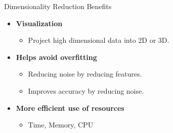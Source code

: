 \documentclass[serif, aspectratio=169]{beamer}
\begin{document}
\begin{frame}{Dimensionality Reduction Benefits}
    \begin{itemize}
        \item \textbf{Visualization}
            \begin{itemize}
                \item Project high dimensional data into 2D or 3D.
            \end{itemize}
        \item \textbf{Helps avoid overfitting}
            \begin{itemize}
                \item Reducing noise by reducing features.
                \item Improves accuracy by reducing noise.
            \end{itemize}
        \item \textbf{More efficient use of resources}
            \begin{itemize}
                \item Time, Memory, CPU
            \end{itemize}
    \end{itemize}
\end{frame}
\end{document}
